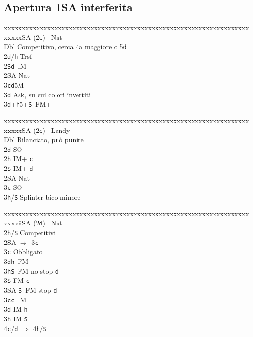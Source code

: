 \documentclass[a4paper,italian]{article}
\newcommand{\BS}{\small{\texttt{S}}}
\newcommand{\BC}{\small{\texttt{c}}}
\newcommand{\BD}{\small{\texttt{d}}}
\newcommand{\BH}{\small{\texttt{h}}}
\newenvironment{bidtable}
{\begin{tabbing}

    xxxxxx\=xxxxxxxxx\=xxxxxxxxx\=xxxxxxx\=xxxxxxx\=xxxxxxx\=xxxxxxx\=xxxxxxx\=xxxxxxx\=xxxxxxx\=\kill}
{\end{tabbing} }%
\begin{document}
\begin{multicols}{2}

    \subsection{Apertura 1SA interferita}

    \begin{bidtable}
        1\small{SA}-(2\BC)-- \> \> Nat\+\\
        Dbl \> Competitivo, cerca 4a maggiore o 5\BD \\
        2\BD/\BH \> Trsf\\
        2\BS {}\BD\ IM+\\
        2\small{SA} \> Nat\\
        3\BC {}\BD 5M\+\\
        3\BD \> Ask, su cui colori invertiti\-\\
        3\BD {}+\BH 5+\BS\ FM+\-
    \end{bidtable}
    \begin{bidtable}
        1\small{SA}-(2\BC)-- \>\> Landy\+\\
        Dbl \> Bilanciato, può punire\\
        2\BD \> SO\\
        2\BH \> IM+ \BC \\
        2\BS \> IM+ \BD \\
        2\small{SA} \> Nat\\
        3\BC \> SO\\
        3\BH/\BS \> Splinter bico minore\-
    \end{bidtable}
    \begin{bidtable}
        1\small{SA}-(2\BD)-- \>\> Nat\+\\
        2\BH/\BS \> Competitivi\\
        2\small{SA} \> $\Rightarrow$ 3\BC \+\\
        3\BC \> Obbligato\+\\
        3\BD {}\BH\ FM+\\
        3\BH {}\BS\ FM no stop \BD \\
        3\BS \> FM \BC \\
        3\small{SA} \BS\ FM stop \BD \-\-\\
        3\BC {}\BC\ IM\\
        3\BD \> IM \BH \\
        3\BH \> IM \BS \\
        4\BC/\BD \> $\Rightarrow$ 4\BH /\BS \-

\end{bidtable}
\end{multicols}
\end{document}
